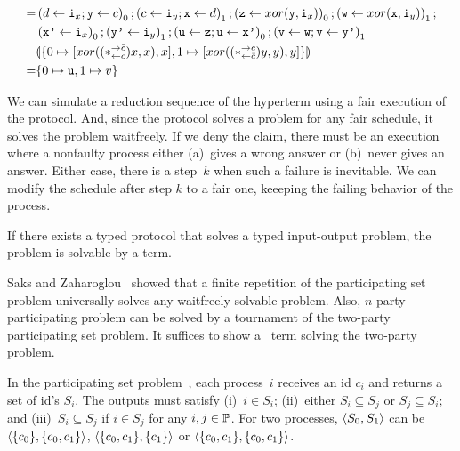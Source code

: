 {\begin{example}
\begin{align*}
   =&\left(d\leftarrow \texttt{i}_x; \texttt{y}\leftarrow c\right)_0;
   \left(c\leftarrow \texttt{i}_y; \texttt{x}\leftarrow d\right)_1;
   \left(\texttt{z}\leftarrow xor(\texttt{y},\texttt{i}_x)\right)_0;
   \left(\texttt{w}\leftarrow xor(\texttt{x},\texttt{i}_y)\right)_1; \\
   & \left(\texttt{x'}\leftarrow \texttt{i}_x\right)_0;
     \left(\texttt{y'}\leftarrow \texttt{i}_y\right)_1;
   \left(\texttt{u} \leftarrow \texttt{z}; \texttt{u} \leftarrow \texttt{x'}\right)_0 ;
   \left(\texttt{v}\leftarrow \texttt{w}; \texttt{v} \leftarrow \texttt{y'}\right)_1
   \\
   &\llparenthesis{
   \{
   0\mapsto [{{xor((\ast^{\rightarrow {\bar{c}}}_{\leftarrow{c}})x,x)},x}],
   1\mapsto [{{xor((\ast^{\rightarrow {c}}_{\leftarrow{\bar{c}}})y,y)},y}]
   \}}\rrparenthesis
   \\
   =&\{0\mapsto\texttt{u},1\mapsto v\}
  \end{align*}
 \end{example}

We can simulate a reduction sequence of
the hyperterm using a fair execution of the protocol.
And, since the protocol solves a problem for any fair schedule, it
solves the problem waitfreely.
If we deny the claim, there must be an execution where a nonfaulty
process
either (a)~gives a
wrong answer or
 (b)~never gives an answer.
 Either case, there is a step~$k$ when
 such a failure is inevitable.
We can modify the schedule after step $k$ to a fair one,
keeeping the failing behavior of
the process.


\begin{theorem}[Completeness]
If there exists a typed protocol that solves a typed input-output
 problem,
the problem is solvable by a term.
\end{theorem}

Saks and Zaharoglou~\cite{Saks:1993vq} showed that a finite repetition of the participating set
problem universally solves any waitfreely solvable problem.
Also, $n$-party participating problem can be solved by a tournament of
the two-party participating set problem.
It suffices to show a \lgd\, term solving the two-party problem.


In the participating set problem~\cite{borowsky},
each process~$i$ receives an id $c_i$ and
returns a set of id's $S_i$.
The outputs must satisfy (i)~$i\in S_i$; (ii)~either $S_i\subseteq S_j$
or $S_j\subseteq S_i$; and (iii)~$S_i\subseteq S_j$  if $i\in S_j$ for any
$i,j\in\mathbb{P}$.
For two processes,
$\langle{S_0, S_1}\rangle$ can be $\langle{\{c_0\}, \{c_0, c_1\}}\rangle$, $\langle{\{c_0, c_1\}, \{c_1\}}\rangle$
or
$\langle{\{c_0, c_1\}, \{c_0, c_1\}}\rangle$.

}
